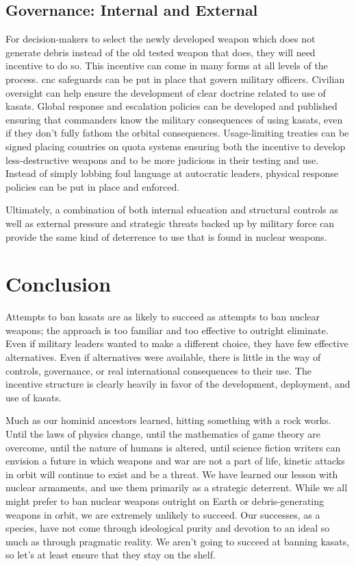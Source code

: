 \subsection*{Governance: Internal and External}
For decision-makers to select the newly developed weapon which does
not generate debris instead of the old tested weapon that does, they
will need incentive to do so.  This incentive can come in many forms
at all levels of the process. \ac{cnc} safeguards can be put in place
that govern military officers.  Civilian oversight can help ensure the
development of clear doctrine related to use of \acp{kasat}.  Global
response and escalation policies can be developed and published
ensuring that commanders know the military consequences of using
\acp{kasat}, even if they don't fully fathom the orbital consequences.
Usage-limiting treaties can be signed placing countries on quota
systems ensuring both the incentive to develop less-destructive
weapons and to be more judicious in their testing and use.  Instead of
simply lobbing foul language at autocratic leaders, physical response
policies can be put in place and enforced.

Ultimately, a combination of both internal education and structural
controls as well as external pressure and strategic threats backed up
by military force can provide the same kind of deterrence to use that
is found in nuclear weapons.

\section*{Conclusion}
Attempts to ban \acp{kasat} are as likely to succeed as attempts to
ban nuclear weapons; the approach is too familiar and too effective to
outright eliminate.  Even if military leaders wanted to make a
different choice, they have few effective alternatives.  Even if
alternatives were available, there is little in the way of controls,
governance, or real international consequences to their use.  The
incentive structure is clearly heavily in favor of the development,
deployment, and use of \acp{kasat}.

Much as our hominid ancestors learned, hitting something with a rock
works.  Until the laws of physics change, until the mathematics of
game theory are overcome, until the nature of humans is altered, until
science fiction writers can envision a future in which weapons and war
are not a part of life, kinetic attacks in orbit will continue to
exist and be a threat.  We have learned our lesson with nuclear
armaments, and use them primarily as a strategic deterrent.  While we
all might prefer to ban nuclear weapons outright on Earth or
debris-generating weapons in orbit, we are extremely unlikely to
succeed.  Our successes, as a species, have not come through
ideological purity and devotion to an ideal so much as through
pragmatic reality.  We aren't going to succeed at banning
\aclp{kasat}, so let's at least ensure that they stay on the shelf.

